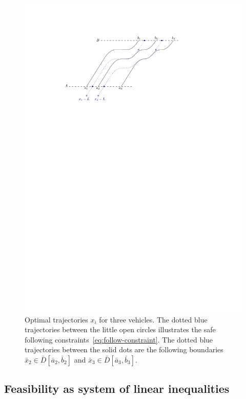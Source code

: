 \documentclass[a4paper]{article}
\theoremstyle{definition}
\theoremstyle{plain}
\begin{document}
\begin{figure}
  \centering
  \includegraphics[scale=1.0]{figures/motion/solution}
  \caption{Optimal trajectories $x_{i}$ for three vehicles. The dotted blue
    trajectories between the little open circles illustrates the safe following
    constraints~\eqref{eq:follow-constraint}. The dotted blue trajectories between
    the solid dots are the following boundaries
    $\bar{x}_{2} \in \bar{D}[\bar{a}_{2}, \bar{b}_{2}]$ and
    $\bar{x}_{3} \in \bar{D}[\bar{a}_{3}, \bar{b}_{3}]$.}%
  \label{fig:solution}
\end{figure}

\newpage
\subsection{Feasibility as system of linear inequalities}\label{sec:feasibility-inequalities}
\end{document}
